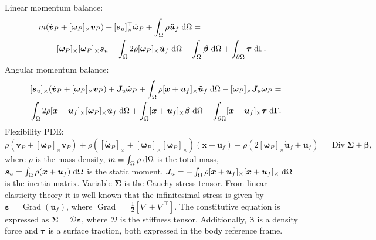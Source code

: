 \documentclass{svjour3}                     %
\DeclareMathOperator*{\Grad}{Grad}
\DeclareMathOperator*{\Div}{Div}
\newcommand{\crmat}[1]{\ensuremath{[#1]_{\times}}}
\begin{document}
Linear momentum balance:
\begin{equation}
\label{eq:rig_tr1}
\begin{split}
&m (\dot{\bm{v}}_P + \crmat{\bm{\omega}_P} \bm{v}_P) + \crmat{\bm{s}_u}^\top \dot{\bm{\omega}}_P  + \int_{\Omega} \rho \ddot{\bm{u}}_f \d{\Omega} = \\
&\quad - \crmat{\bm{\omega}_P} \crmat{\bm{\omega}_P} \bm{s}_u - \int_{\Omega} 2 \rho \crmat{\bm{\omega}_P} \dot{\bm{u}}_f \d{\Omega} +  \int_{\Omega} \bm\beta \d{\Omega} + \int_{\partial \Omega} \bm\tau \d{\Gamma}.
\end{split}
\end{equation}
Angular momentum balance:
\begin{equation}
\label{eq:rig_rot1}
\begin{split}
\crmat{\bm{s}_u} (\dot{\bm{v}}_P + \crmat{\bm{\omega}_P} \bm{v}_P) + \bm{J}_u \dot{\bm\omega}_P + \int_{\Omega} \rho \crmat{\bm{x}+\bm{u}_f} \ddot{\bm{u}}_f \d{\Omega} - \crmat{\bm{\omega}_P} \bm{J}_u \bm{\omega}_P = \\ 
- \int_{\Omega} 2\rho \crmat{\bm{x}+\bm{u}_f} \crmat{\bm\omega_P} \dot{\bm{u}}_f \d{\Omega} + \int_{\Omega}\crmat{\bm{x}+\bm{u}_f} \bm\beta \d{\Omega} + \int_{\partial \Omega}\crmat{\bm{x}+\bm{u}_f} \bm\tau \d{\Gamma}. \\
\end{split}
\end{equation}
Flexibility PDE:
\begin{equation}
\label{eq:flex1}
\rho (\dot{\bm{v}}_P + \crmat{\bm\omega_P} \bm{v}_P) + \rho (\crmat{\dot{\bm\omega}_P} + \crmat{\bm{\omega}_P}\crmat{\bm{\omega}_P})(\bm{x}+\bm{u}_f) + \rho (2 \crmat{\bm{\omega}_P} \dot{\bm{u}}_f + \ddot{\bm{u}}_f) = \Div{\bm\Sigma} + \bm\beta,
\end{equation}
where $\rho$ is the mass density, $m = \int_{\Omega} \rho \d{\Omega}$ is the total mass,  $\bm{s}_u = \int_{\Omega} \rho (\bm{x}+\bm{u}_f) \d{\Omega}$ is the static moment, $\bm{J}_u= - \int_{\Omega} \rho \crmat{\bm{x}+\bm{u}_f}\crmat{\bm{x}+\bm{u}_f} \d{\Omega}$ is the inertia matrix. Variable $\bm\Sigma$ is the Cauchy stress tensor. From linear elasticity theory it is well known that the infinitesimal stress is given by $\bm\varepsilon = \Grad(\bm{u}_f)$, where $\Grad=~\frac{1}{2} [\nabla + \nabla^\top]$. The constitutive equation is expressed as $\bm\Sigma =  \bm{\mathcal{D}} \bm\varepsilon$, where $ \bm{\mathcal{D}}$ is the stiffness tensor. Additionally, $\bm\beta$ is a density force and $\bm\tau$ is a surface traction, both expressed in the body reference frame. \\
\end{document}
